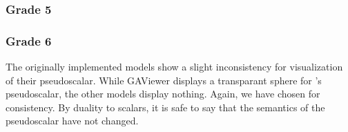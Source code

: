 


\subsubsection{Grade 5}


\subsubsection{Grade 6}
The originally implemented models show a slight inconsistency for visualization of their pseudoscalar.  While GAViewer displays a transparant sphere for \ega{}'s pseudoscalar, the other models display nothing.  Again, we have chosen for consistency.  By duality to scalars, it is safe to say that the semantics of the pseudoscalar have not changed.
